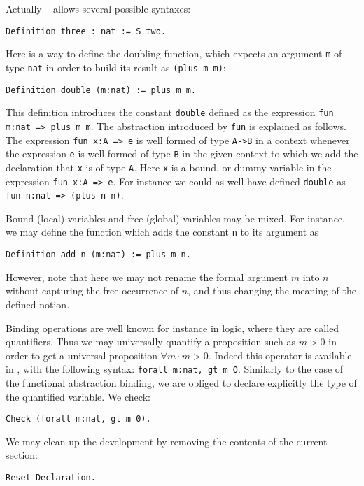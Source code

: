 \documentclass{book}
\begin{document}
Actually \Coq~ allows several possible syntaxes:
\begin{lstlisting}
Definition three : nat := S two.
\end{lstlisting}

Here is a way to define the doubling function, which expects an
argument \verb:m: of type \verb:nat: in order to build its result as
\verb:(plus m m)::

\begin{lstlisting}
Definition double (m:nat) := plus m m.
\end{lstlisting}
This definition introduces the constant \texttt{double} defined as the
expression \texttt{fun m:nat => plus m m}.
The abstraction introduced by \texttt{fun} is explained as follows. The expression
\verb+fun x:A => e+ is well formed of type \verb+A->B+ in a context
whenever the expression \verb+e+ is well-formed of type \verb+B+ in 
the given context to which we add the declaration that \verb+x+
is of type \verb+A+. Here \verb+x+ is a bound, or dummy variable in
the expression \verb+fun x:A => e+. For instance we could as well have
defined \verb:double: as \verb+fun n:nat => (plus n n)+.

Bound (local) variables and free (global) variables may be mixed.
For instance, we may define the function which adds the constant \verb:n:
to its argument as
\begin{lstlisting}
Definition add_n (m:nat) := plus m n.
\end{lstlisting}
However, note that here we may not rename the formal argument $m$ into $n$
without capturing the free occurrence of $n$, and thus changing the meaning
of the defined notion.

Binding operations are well known for instance in logic, where they
are called quantifiers.  Thus we may universally quantify a
proposition such as $m>0$ in order to get a universal proposition
$\forall m\cdot m>0$. Indeed this operator is available in \Coq, with
the following syntax: \verb+forall m:nat, gt m O+. Similarly to the
case of the functional abstraction binding, we are obliged to declare
explicitly the type of the quantified variable. We check:
\begin{lstlisting}
Check (forall m:nat, gt m 0).
\end{lstlisting}
We may clean-up the development by removing the contents of the
current section:
\begin{lstlisting}
Reset Declaration.
\end{lstlisting}
\end{document}
